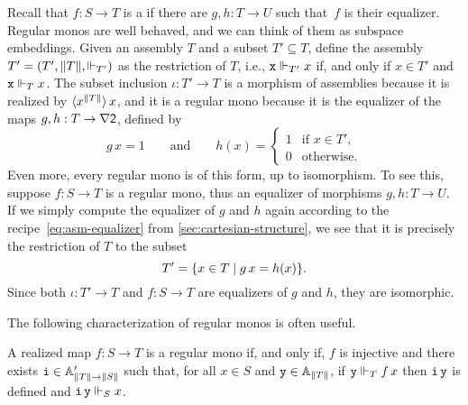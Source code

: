 Recall that $f : S \to T$ is a  if
there are $g, h : T \to U$ such that~$f$ is their
equalizer. Regular monos are well behaved, and we can think of them as
subspace embeddings. Given an assembly $T$ and a subset $T'
\subseteq T$, define the assembly $T' = (T', \T{T}, {\rz[T']})$
as the restriction of $T$, i.e., $\R{x} \rz[T'] x$ if, and only
if $x \in T'$ and $\R{x} \rz[T] x$. The subset inclusion $\iota : T'
\to T$ is a morphism of assemblies because it is realized by
$\tpcalam{x}{\T{T}} x$, and it is a regular mono because it is
the equalizer of the maps $g, h : T \to \nabla \two$, defined by
%
\begin{equation*}
  g\,x = 1
  \qquad\text{and}\qquad
  h(x) =
  \begin{cases}
    1 & \text{if $x \in T'$,}\\
    0 & \text{otherwise}.
  \end{cases}
\end{equation*}
%
Even more, every regular mono is of this form, up to isomorphism. To
see this, suppose $f : S \to T$ is a regular mono, thus an
equalizer of morphisms $g, h : T \to U$. If we simply
compute the equalizer of $g$ and $h$ again according to the
recipe~\eqref{eq:asm-equalizer} from
\cref{sec:cartesian-structure}, we see that it is precisely the
restriction of $T$ to the subset
% 
\begin{equation*}
  T' = \set{x \in T \such g\,x = h(x)}.
\end{equation*}
% 
Since both $\iota : T' \to T$ and $f : S \to
T$ are equalizers of $g$ and $h$, they are isomorphic.

The following characterization of regular monos is often useful.

\begin{proposition}
  \label{prop:reg-mono-when}%
  A realized map $f : S \to T$ is a regular mono if, and
  only if, $f$ is injective and there exists $\R{i} \in \subAtyp{\T{T}
    \to \T{S}}$ such that, for all $x \in S$ and $\R{y} \in \Atyp{\T{T}}$,
  if $\R{y} \rz[T] f\,x$ then $\R{i}\,\R{y}$ is defined and
  $\R{i}\,\R{y} \rz[S] x$.
\end{proposition}

